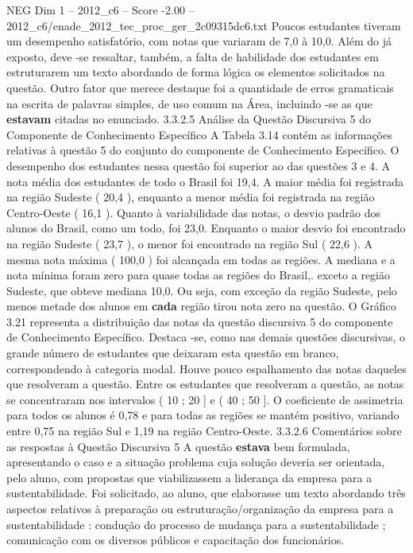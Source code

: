 \begin{textsample}{NEG Dim 1 – 2012\_c6 – Score -2.00 – 2012\_c6/enade\_2012\_tec\_proc\_ger\_2c09315dc6.txt}
Poucos estudantes tiveram um desempenho satisfatório, com notas que variaram de 7,0 à 10,0.
Além do já exposto, deve -se ressaltar, também, a falta de habilidade dos estudantes em estruturarem um texto abordando de forma lógica os elementos solicitados na questão.
Outro fator que merece destaque foi a quantidade de erros gramaticais na escrita de palavras simples, de uso comum na Área, incluindo -se as que \textbf{estavam} citadas no enunciado. 3.3.2.5 Análise da Questão Discursiva 5 do Componente de Conhecimento Específico A Tabela 3.14 contém as informações relativas à questão 5 do conjunto do componente de Conhecimento Específico.
O desempenho dos estudantes nessa questão foi superior ao das questões 3 e 4.
A nota média dos estudantes de todo o Brasil foi 19,4.
A maior média foi registrada na região Sudeste ( 20,4 ), enquanto a menor média foi registrada na região Centro-Oeste ( 16,1 ).
Quanto à variabilidade das notas, o desvio padrão dos alunos do Brasil, como um todo, foi 23,0.
Enquanto o maior desvio foi encontrado na região Sudeste ( 23,7 ), o menor foi encontrado na região Sul ( 22,6 ).
A mesma nota máxima ( 100,0 ) foi alcançada em todas as regiões.
A mediana e a nota mínima foram zero para quase todas as regiões do Brasil,. exceto a região Sudeste, que obteve mediana 10,0.
Ou seja, com exceção da região Sudeste, pelo menos metade dos alunos em \textbf{cada} região tirou nota zero na questão.
O Gráfico 3.21 representa a distribuição das notas da questão discursiva 5 do componente de Conhecimento Específico.
Destaca -se, como nas demais questões discursivas, o grande número de estudantes que deixaram esta questão em branco, correspondendo à categoria modal.
Houve pouco espalhamento das notas daqueles que resolveram a questão.
Entre os estudantes que resolveram a questão, as notas se concentraram nos intervalos ( 10 ; 20 ] e ( 40 ; 50 ].
O coeficiente de assimetria para todos os alunos é 0,78 e para todas as regiões se mantém positivo, variando entre 0,75 na região Sul e 1,19 na região Centro-Oeste. 3.3.2.6 Comentários sobre as respostas à Questão Discursiva 5 A questão \textbf{estava} bem formulada, apresentando o caso e a situação problema cuja solução deveria ser orientada, pelo aluno, com propostas que viabilizassem a liderança da empresa para a sustentabilidade.
Foi solicitado, ao aluno, que elaborasse um texto abordando três aspectos relativos à preparação ou estruturação/organização da empresa para a sustentabilidade : condução do processo de mudança para a sustentabilidade ; comunicação com os diversos públicos e capacitação dos funcionários.

\end{textsample}
